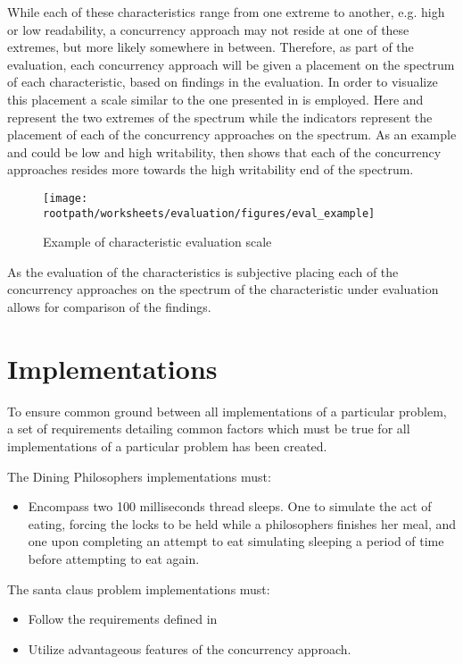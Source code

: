 While each of these characteristics range from one extreme to another, e.g. high or low readability, a concurrency approach may not reside at one of these extremes, but more likely somewhere in between. Therefore, as part of the evaluation, each concurrency approach will be given a placement on the spectrum of each characteristic, based on findings in the evaluation. In order to visualize this placement a scale similar to the one presented in  is employed. Here  and  represent the two extremes of the spectrum while the indicators represent the placement of each of the concurrency approaches on the spectrum. As an example  and  could be low and high writability,  then shows that each of the concurrency approaches resides more towards the high writability end of the spectrum.
\begin{figure}[ht!]
\centering
\texttt{[image: \\rootpath/worksheets/evaluation/figures/eval\_example]}
\caption{Example of characteristic evaluation scale}\label{fig:evel_example}
\end{figure}
As the evaluation of the characteristics is subjective placing each of the concurrency approaches on the spectrum of the characteristic under evaluation allows for comparison of the findings.
\section{Implementations}
To ensure common ground between all implementations of a particular problem, a set of requirements detailing common factors which must be true for all implementations of a particular problem has been created.

The Dining Philosophers implementations must:
\begin{itemize}
	\item Encompass two 100 milliseconds thread sleeps. One to simulate the act of eating, forcing the locks to be held while a philosophers finishes her meal, and one upon completing an attempt to eat simulating sleeping a period of time before attempting to eat again.
\end{itemize}

The santa claus problem implementations must:
\begin{itemize}
	\item Follow the requirements defined in \cite{trono1994new}
	\item Utilize advantageous features of the concurrency approach.
\end{itemize}

